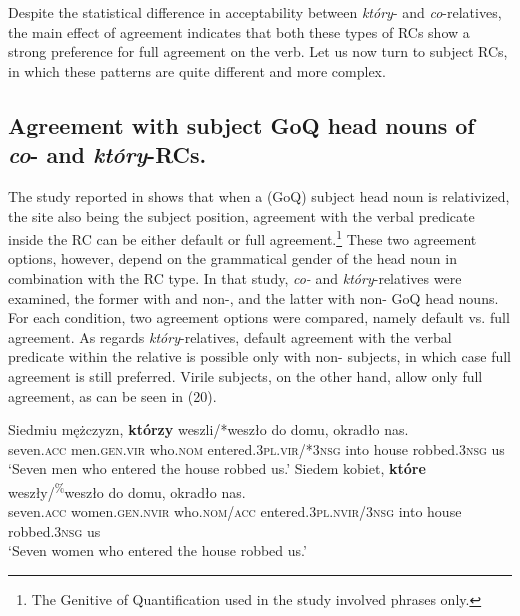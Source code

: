 \documentclass[output=paper]{langsci/langscibook}
\begin{document}
Despite the statistical difference in acceptability between \textit{który}{}- and \textit{co}{}-rel\-a\-tives, the main effect of agreement indicates that both these types of RCs show a strong preference for full agreement on the verb. Let us now turn to subject RCs, in which these patterns are quite different and more complex. 
 
\subsection{Agreement with subject GoQ head nouns of \textit{co}{}- and \textit{który}{}-RCs.}%
The study reported in \citet{Łęska2016} shows that when a  (GoQ) subject head noun is relativized, the  site also being the subject position, agreement with the verbal predicate inside the RC can be either default or full agreement.\footnote{The Genitive of Quantification used in the study involved  phrases only.} These two agreement options, however, depend on the grammatical gender of the head noun in combination with the RC type. In that study, \textit{co-} and \textit{który}{}-relatives were examined, the former with  and non-, and the latter with non- GoQ head nouns. For each condition, two agreement options were compared, namely default vs. full agreement. As regards \textit{który}{}-relatives, default agreement with the verbal predicate within the relative is possible only with non- subjects, in which case full agreement is still preferred. Virile subjects, on the other hand, allow only full agreement, as can be seen in (20).

\ea%
    \label{ex:leska:20}
    \ea
    \gll Siedmiu   mężczyzn,  \textbf{którzy}   weszli/*weszło  do   domu,   okradło     nas.        \\
          seven.\textsc{acc}   men.\textsc{gen.vir}   who.\textsc{nom}  entered.\textsc{3pl.vir/*3nsg}       into  house     robbed.\textsc{3nsg}   us   \\
    \glt ‘Seven men who entered the house robbed us.’
    \ex
    \gll  Siedem   kobiet,     \textbf{które}   weszły/\textsuperscript{\%}weszło       do   domu,   okradło     nas.  \\
           seven.\textsc{acc}   women.\textsc{gen.nvir} who.\textsc{nom/acc}  entered.\textsc{3pl.nvir}/\textsc{3nsg}  into   house     robbed.\textsc{3nsg}   us\\
    \glt  ‘Seven women who entered the house robbed us.’
    \z
\z    
\end{document}
